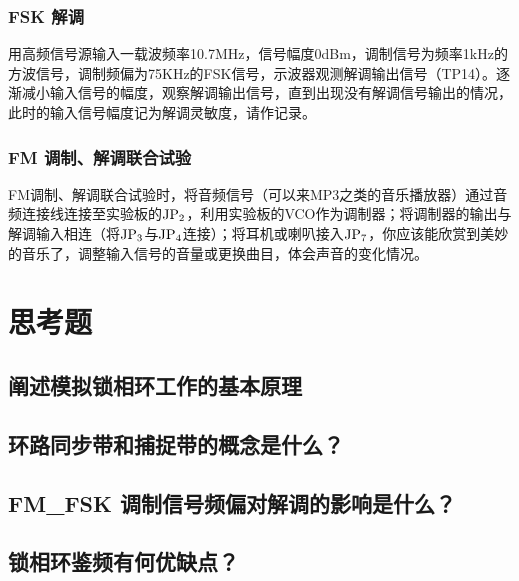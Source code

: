 \documentclass{../source/Experiment}
\begin{document}
\subsubsection{FSK 解调}
用高频信号源输入一载波频率10.7MHz，信号幅度0dBm，调制信号为频率1kHz的方波信号，调制频偏为75KHz的FSK信号，示波器观测解调输出信号（TP14）。逐渐减小输入信号的幅度，观察解调输出信号，直到出现没有解调信号输出的情况，此时的输入信号幅度记为解调灵敏度，请作记录。
\subsubsection{FM 调制、解调联合试验}

FM调制、解调联合试验时，将音频信号（可以来MP3之类的音乐播放器）通过音频连接线连接至实验板的$\rm JP_2$，利用实验板的VCO作为调制器；将调制器的输出与解调输入相连（将$\rm JP_3$与$\rm JP_4$连接）；将耳机或喇叭接入$\rm JP_7$，你应该能欣赏到美妙的音乐了，调整输入信号的音量或更换曲目，体会声音的变化情况。

\section{思考题}
\subsection{阐述模拟锁相环工作的基本原理 }

\subsection{环路同步带和捕捉带的概念是什么？}

\subsection{FM\_FSK 调制信号频偏对解调的影响是什么？}

\subsection{锁相环鉴频有何优缺点？}
\end{document}
